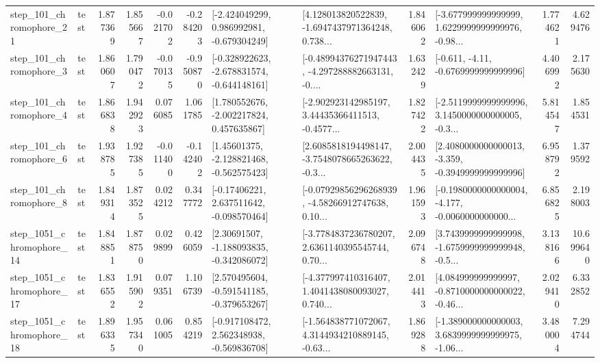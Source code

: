 \begin{tabular}{llrrrrllrlrr}
  step\_101\_chromophore\_21 &      test &      1.877369 &    1.855667 &     -0.021702 & -0.284203 &   [-2.424049299, 0.986992981, -0.679304249] &  [4.128013820522839, -1.6947437971364248, 0.738... &       1.846062 &  [-3.677999999999999, 1.6229999999999976, -0.98... &            1.774621 &          4.629476 \\
   step\_101\_chromophore\_3 &      test &      1.860607 &    1.790472 &     -0.070135 & -0.950870 &  [-0.328922623, -2.678831574, -0.644148161] &  [-0.48994376271947443, -4.297288882663131, -0.... &       1.632429 &               [-0.611, -4.11, -0.6769999999999996] &            4.406992 &          2.175630 \\
   step\_101\_chromophore\_4 &      test &      1.866838 &    1.942923 &      0.076085 &  1.061785 &    [1.780552676, -2.002217824, 0.457635867] &  [-2.902923142985197, 3.44435366411513, -0.4577... &       1.827422 &  [-2.5119999999999996, 3.1450000000000005, -0.3... &            5.814547 &          1.854531 \\
   step\_101\_chromophore\_6 &      test &      1.938785 &    1.927385 &     -0.011400 & -0.142402 &    [1.45601375, -2.128821468, -0.562575423] &  [2.6085818194498147, -3.7548078665263622, -0.3... &       2.004435 &  [2.4080000000000013, -3.359, -0.3949999999999996] &            6.958792 &          1.379592 \\
   step\_101\_chromophore\_8 &      test &      1.849314 &    1.873525 &      0.024212 &  0.347772 &    [-0.17406221, 2.637511642, -0.098570464] &  [-0.07929856296268939, -4.58266912747638, 0.10... &       1.961593 &  [-0.1980000000000004, -4.177, -0.0060000000000... &            6.856825 &          2.198003 \\
 step\_1051\_chromophore\_14 &      test &      1.848851 &    1.878750 &      0.029899 &  0.426059 &    [2.30691507, -1.188093835, -0.342086072] &  [-3.7784837236780207, 2.6361140395545744, 0.70... &       2.096748 &  [3.7439999999999998, -1.6759999999999948, -0.5... &            3.138166 &         10.699640 \\
 step\_1051\_chromophore\_17 &      test &      1.836552 &    1.915902 &      0.079351 &  1.106739 &   [2.570495604, -0.591541185, -0.379653267] &  [-4.377997410316407, 1.4041438080093027, 0.740... &       2.014413 &  [4.084999999999997, -0.8710000000000022, -0.46... &            2.029410 &          6.332852 \\
 step\_1051\_chromophore\_18 &      test &      1.896335 &    1.957340 &      0.061005 &  0.854219 &   [-0.917108472, 2.562348938, -0.569836708] &  [-1.564838771072067, 4.3144934210889145, -0.63... &       1.869288 &  [-1.389000000000003, 3.6839999999999975, -1.06... &            3.480004 &          7.294744 \\

\end{tabular}
